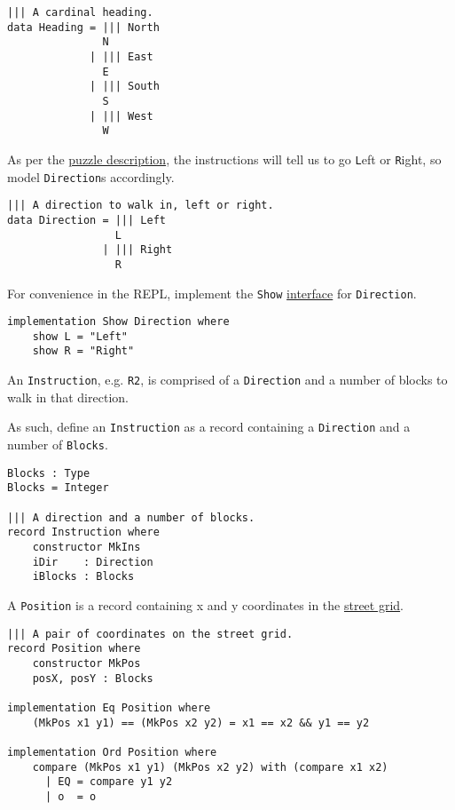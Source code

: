 \begin{verbatim}
||| A cardinal heading.
data Heading = ||| North
               N
             | ||| East
               E
             | ||| South
               S
             | ||| West
               W
\end{verbatim}

As per the \href{no-time-for-a-taxicab}{puzzle description}, the
instructions will tell us to go \texttt{L}eft or
\texttt{R}ight, so model \texttt{Direction}s
accordingly.

\begin{verbatim}
||| A direction to walk in, left or right.
data Direction = ||| Left
                 L
               | ||| Right
                 R
\end{verbatim}

\newpage

For convenience in the REPL, implement the \texttt{Show}
\href{http://docs.idris-lang.org/en/latest/tutorial/interfaces.html}{interface}
for \texttt{Direction}.

\begin{verbatim}
implementation Show Direction where
    show L = "Left"
    show R = "Right"
\end{verbatim}

An \texttt{Instruction}, e.g. \texttt{R2}, is
comprised of a \texttt{Direction} and a number of blocks to
walk in that direction.

As such, define an \texttt{Instruction} as a record
containing a \texttt{Direction} and a number of
\texttt{Blocks}.

\begin{verbatim}
Blocks : Type
Blocks = Integer

||| A direction and a number of blocks.
record Instruction where
    constructor MkIns
    iDir    : Direction
    iBlocks : Blocks
\end{verbatim}

A \texttt{Position} is a record containing x and y
coordinates in the
\href{https://en.wikipedia.org/wiki/Taxicab_geometry}{street grid}.

\begin{verbatim}
||| A pair of coordinates on the street grid.
record Position where
    constructor MkPos
    posX, posY : Blocks

implementation Eq Position where
    (MkPos x1 y1) == (MkPos x2 y2) = x1 == x2 && y1 == y2

implementation Ord Position where
    compare (MkPos x1 y1) (MkPos x2 y2) with (compare x1 x2)
      | EQ = compare y1 y2
      | o  = o
\end{verbatim}

